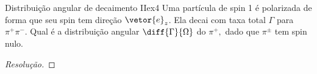 \begin{exercício}{Distribuição angular de decaimento II}{ex4}
   Uma partícula de spin 1 é polarizada de forma que seu spin tem direção \(\vetor{e}_z\). Ela decai com taxa total \(\Gamma\) para \(\pi^+\pi^-.\) Qual é a distribuição angular \(\diff{\Gamma}{\Omega}\) do \(\pi^+,\) dado que \(\pi^\pm\) tem spin nulo.
\end{exercício}
\begin{proof}[Resolução]
    
\end{proof}
